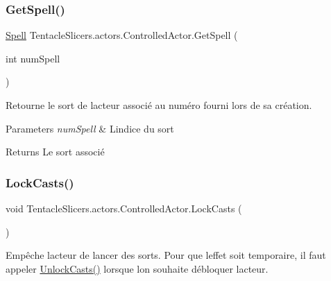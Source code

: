 \subsubsection{\texorpdfstring{Get\+Spell()}{GetSpell()}}
{\footnotesize\ttfamily \hyperlink{class_tentacle_slicers_1_1spells_1_1_spell}{Spell} Tentacle\+Slicers.\+actors.\+Controlled\+Actor.\+Get\+Spell (\begin{DoxyParamCaption}\item[{int}]{num\+Spell }\end{DoxyParamCaption})}



Retourne le sort de l\textquotesingle{}acteur associé au numéro fourni lors de sa création. 


\begin{DoxyParams}{Parameters}
{\em num\+Spell} & L\textquotesingle{}indice du sort \\
\hline
\end{DoxyParams}
\begin{DoxyReturn}{Returns}
Le sort associé 
\end{DoxyReturn}
\mbox{\label{class_tentacle_slicers_1_1actors_1_1_controlled_actor_a61e01e8419547521e6ed595bb4ca6226}} 
\subsubsection{\texorpdfstring{Lock\+Casts()}{LockCasts()}}
{\footnotesize\ttfamily void Tentacle\+Slicers.\+actors.\+Controlled\+Actor.\+Lock\+Casts (\begin{DoxyParamCaption}{ }\end{DoxyParamCaption})}



Empêche l\textquotesingle{}acteur de lancer des sorts. Pour que l\textquotesingle{}effet soit temporaire, il faut appeler \hyperlink{class_tentacle_slicers_1_1actors_1_1_controlled_actor_a046c8e6ce7e9d5a2cf7520939cba40a0}{Unlock\+Casts()} lorsque l\textquotesingle{}on souhaite débloquer l\textquotesingle{}acteur. 

\mbox{\label{class_tentacle_slicers_1_1actors_1_1_controlled_actor_a2dece877131bcd6f29898b3b7c594524}} 
